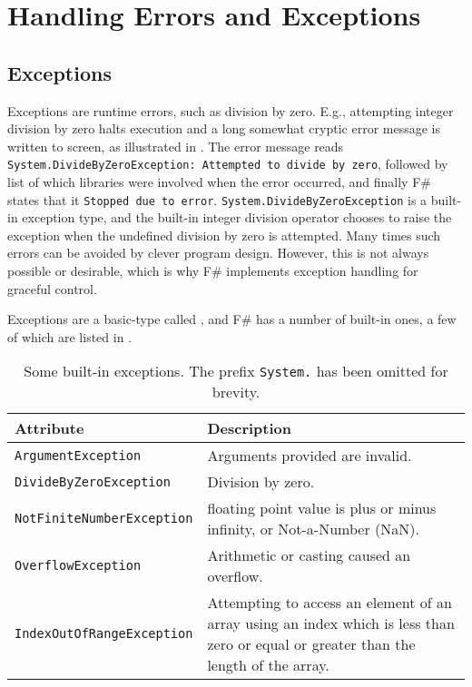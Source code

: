 \documentclass[fsharpnotes.tex]{subfiles}
\begin{document}
\chapter{Handling Errors and Exceptions}
\label{chap:errors}

\section{Exceptions}
\label{sec:exceptions}
Exceptions are runtime errors, such as division by zero. E.g., attempting integer division by zero halts execution and a long somewhat cryptic error message is written to screen, as illustrated in .
%
%
The error message reads \lstinline[language=console]{System.DivideByZeroException: Attempted to divide by zero}, followed by list of which libraries were involved when the error occurred, and finally F\# states that it \lstinline[language=console]{Stopped due to error}. \lstinline{System.DivideByZeroException} is a built-in exception type, and the built-in integer division operator chooses to raise the exception when the undefined division by zero is attempted. Many times such errors can be avoided by clever program design. However, this is not always possible or desirable, which is why F\# implements exception handling for graceful control.

Exceptions are a basic-type called , and F\# has a number of built-in ones, a few of which are listed in .
\begin{table}
  \centering
  \begin{tabularx}{\linewidth}{|l|X|}
    \hline
    \rowcolor{headerRowColor} Attribute & Description\\
    \hline
    \lstinline!ArgumentException! & Arguments provided are invalid.\\
    \hline
    \lstinline!DivideByZeroException! & Division by zero.\\
    \hline
    \lstinline!NotFiniteNumberException! & floating point value is plus or minus infinity, or Not-a-Number (NaN).\\
    \hline
    \lstinline!OverflowException! & Arithmetic or casting caused an overflow.\\
    \hline
    \lstinline!IndexOutOfRangeException! & Attempting to access an element of an array using an index which is less than zero or equal or greater than the length of the array.\\
    \hline
  \end{tabularx}
  \caption{Some built-in exceptions. The prefix \lstinline{System.} has been omitted for brevity.}
  \label{tab:exceptions}
\end{table}
\end{document}
